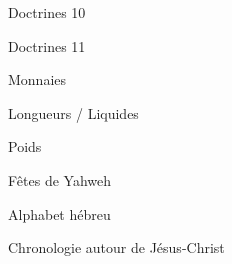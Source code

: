 \documentclass[11pt]{book}
\begin{document}
\begin{center}Doctrines 10\end{center}\clearpage
\begin{center}Doctrines 11\end{center}\clearpage
\clearpage
\begin{center}Monnaies\end{center}\clearpage
\clearpage
\begin{center}Longueurs / Liquides\end{center}\clearpage
\clearpage
\begin{center}Poids\end{center}\clearpage
\clearpage
\begin{center}Fêtes de Yahweh\end{center}\clearpage
\clearpage
\begin{center}Alphabet hébreu\end{center}\clearpage
\clearpage
\begin{center}Chronologie autour de Jésus-Christ\end{center}\clearpage
\end{document}
